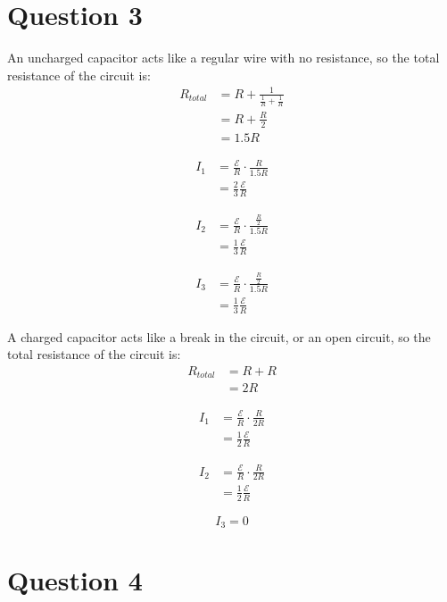 \documentclass[11pt]{article}
\begin{document}
\newpage
\section{Question 3}
\label{sec:org2d404bb}
An uncharged capacitor acts like a regular wire with no resistance, so the total resistance of the circuit is:
\begin{align*}
R_{total} &= R + \frac{1}{\frac{1}{R} + \frac{1}{R}} \\
&= R + \frac{R}{2} \\
&= 1.5R
\end{align*}

\begin{align*}
I_1 &= \frac{\mathcal{E}}{R} \cdot \frac{R}{1.5R} \\
&= \frac{2}{3} \frac{\mathcal{E}}{R}
\end{align*}

\begin{align*}
I_2 &= \frac{\mathcal{E}}{R} \cdot \frac{\frac{R}{2}}{1.5R} \\
&= \frac{1}{3} \frac{\mathcal{E}}{R}
\end{align*}

\begin{align*}
I_3 &= \frac{\mathcal{E}}{R} \cdot \frac{\frac{R}{2}}{1.5R} \\
&= \frac{1}{3} \frac{\mathcal{E}}{R}
\end{align*}

\newpage

A charged capacitor acts like a break in the circuit, or an open circuit, so the total resistance of the circuit is:
\begin{align*}
R_{total} &= R + R \\
&= 2R
\end{align*}

\begin{align*}
I_1 &= \frac{\mathcal{E}}{R} \cdot \frac{R}{2R} \\
&= \frac{1}{2} \frac{\mathcal{E}}{R}
\end{align*}

\begin{align*}
I_2 &= \frac{\mathcal{E}}{R} \cdot \frac{R}{2R} \\
&= \frac{1}{2} \frac{\mathcal{E}}{R}
\end{align*}

\[I_3 = 0\]
\section{Question 4}
\label{sec:orgf8e35b3}
\end{document}
